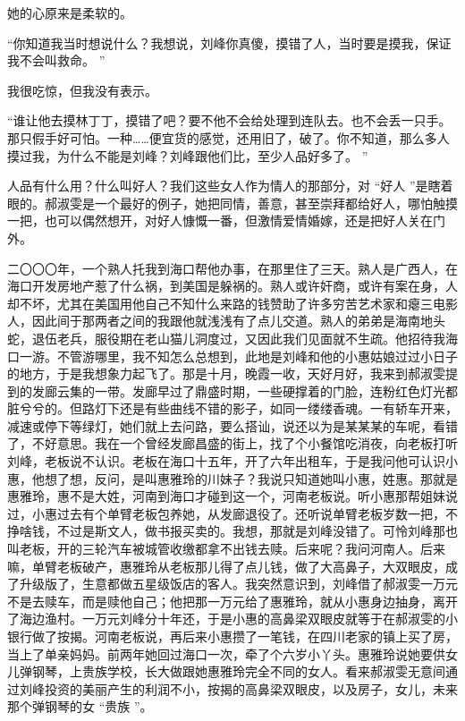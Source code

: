 \documentclass[12pt,twoside,openany]{book}
\begin{document}
她的心原来是柔软的。

“你知道我当时想说什么？我想说，刘峰你真傻，摸错了人，当时要是摸我，保证我不会叫救命。 ”

我很吃惊，但我没有表示。

“谁让他去摸林丁丁，摸错了吧？要不他不会给处理到连队去。也不会丢一只手。那只假手好可怕。一种……便宜货的感觉，还用旧了，破了。你不知道，那么多人摸过我，为什么不能是刘峰？刘峰跟他们比，至少人品好多了。 ”

人品有什么用？什么叫好人？我们这些女人作为情人的那部分，对 “好人 ”是瞎着眼的。郝淑雯是一个最好的例子，她把同情，善意，甚至崇拜都给好人，哪怕触摸一把，也可以偶然想开，对好人慷慨一番，但激情爱情婚嫁，还是把好人关在门外。

二〇〇〇年，一个熟人托我到海口帮他办事，在那里住了三天。熟人是广西人，在海口开发房地产惹了什么祸，到美国是躲祸的。熟人或许奸商，或许有案在身，人却不坏，尤其在美国用他自己不知什么来路的钱赞助了许多穷苦艺术家和瘪三电影人，因此间于那两者之间的我跟他就浅浅有了点儿交道。熟人的弟弟是海南地头蛇，退伍老兵，服役期在老山猫儿洞度过，又因此我们见面就不生疏。他招待我海口一游。不管游哪里，我不知怎么总想到，此地是刘峰和他的小惠姑娘过过小日子的地方，于是我想象力起飞了。那是十月，晚霞一收，天好月好，我来到郝淑雯提到的发廊云集的一带。发廊早过了鼎盛时期，一些硬撑着的门脸，连粉红色灯光都脏兮兮的。但路灯下还是有些曲线不错的影子，如同一缕缕香魂。一有轿车开来，减速或停下等绿灯，她们就上去问路，要么搭讪，说还以为是某某某的车呢，看错了，不好意思。我在一个曾经发廊昌盛的街上，找了个小餐馆吃消夜，向老板打听刘峰，老板说不认识。老板在海口十五年，开了六年出租车，于是我问他可认识小惠，他想了想，反问，是叫惠雅玲的川妹子？我说只知道她叫小惠，姓惠。那就是惠雅玲，惠不是大姓，河南到海口才碰到这一个，河南老板说。听小惠那帮姐妹说过，小惠过去有个单臂老板包养她，从发廊退役了。还听说单臂老板岁数一把，不挣啥钱，不过是斯文人，做书报买卖的。我想，那就是刘峰没错了。可怜刘峰那也叫老板，开的三轮汽车被城管收缴都拿不出钱去赎。后来呢？我问河南人。后来嘛，单臂老板破产，惠雅玲从老板那儿得了点儿钱，做了大高鼻子，大双眼皮，成了升级版了，生意都做五星级饭店的客人。我突然意识到，刘峰借了郝淑雯一万元不是去赎车，而是赎他自己；他把那一万元给了惠雅玲，就从小惠身边抽身，离开了海边渔村。一万元刘峰分十年还，于是小惠的高鼻梁双眼皮就等于在郝淑雯的小银行做了按揭。河南老板说，再后来小惠攒了一笔钱，在四川老家的镇上买了房，当上了单亲妈妈。前两年她回过海口一次，牵了个六岁小丫头。惠雅玲说她要供女儿弹钢琴，上贵族学校，长大做跟她惠雅玲完全不同的女人。看来郝淑雯无意间通过刘峰投资的美丽产生的利润不小，按揭的高鼻梁双眼皮，以及房子，女儿，未来那个弹钢琴的女 “贵族 ”。
\end{document}
